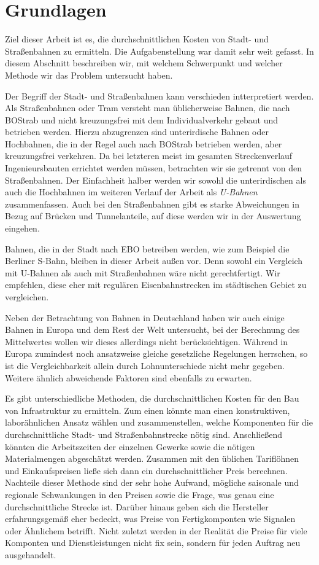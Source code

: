 \chapter{Grundlagen}

Ziel dieser Arbeit ist es, die durchschnittlichen Kosten von Stadt- und
Straßenbahnen zu ermitteln. Die Aufgabenstellung war damit sehr weit gefasst. In
diesem Abschnitt beschreiben wir, mit welchem Schwerpunkt und welcher Methode wir
das Problem untersucht haben.

Der Begriff der Stadt- und Straßenbahnen kann verschieden intterpretiert
werden. Als Straßenbahnen oder Tram versteht man üblicherweise Bahnen, die nach
BOStrab \cite{bostrab} und nicht kreuzungsfrei mit dem Individualverkehr gebaut
und betrieben werden. Hierzu abzugrenzen sind unterirdische Bahnen oder
Hochbahnen, die in der Regel auch nach BOStrab betrieben werden, aber
kreuzungsfrei verkehren. Da bei letzteren meist im gesamten Streckenverlauf
Ingenieursbauten errichtet werden müssen, betrachten wir sie getrennt von den
Straßenbahnen. Der Einfachheit halber werden wir sowohl die unterirdischen als
auch die Hochbahnen im weiteren Verlauf der Arbeit als \emph{U-Bahnen}
zusammenfassen. Auch bei den Straßenbahnen gibt es starke Abweichungen in Bezug
auf Brücken und Tunnelanteile, auf diese werden wir in der Auswertung eingehen.

Bahnen, die in der Stadt nach EBO \cite{ebo} betreiben werden, wie zum Beispiel
die Berliner S-Bahn, bleiben in dieser Arbeit außen vor. Denn sowohl ein
Vergleich mit U-Bahnen als auch mit Straßenbahnen wäre nicht gerechtfertigt. Wir
empfehlen, diese eher mit regulären Eisenbahnstrecken im städtischen Gebiet zu
vergleichen.

Neben der Betrachtung von Bahnen in Deutschland haben wir auch einige Bahnen in
Europa und dem Rest der Welt untersucht, bei der Berechnung des Mittelwertes
wollen wir dieses allerdings nicht berücksichtigen. Während in Europa zumindest noch
ansatzweise gleiche gesetzliche Regelungen herrschen, so ist die
Vergleichbarkeit allein durch Lohnunterschiede nicht mehr gegeben. Weitere
ähnlich abweichende Faktoren sind ebenfalls zu erwarten.

Es gibt unterschiedliche Methoden, die durchschnittlichen Kosten für den Bau von
Infrastruktur zu ermitteln. Zum einen könnte man einen konstruktiven,
laborähnlichen Ansatz wählen und zusammenstellen, welche Komponenten für die
durchschnittliche Stadt- und Straßenbahnstrecke nötig sind. Anschließend könnten
die Arbeitszeiten der einzelnen Gewerke sowie die nötigen Materialmengen
abgeschätzt werden. Zusammen mit den üblichen Tariflöhnen und Einkaufspreisen
ließe sich dann ein durchschnittlicher Preis berechnen. Nachteile dieser Methode
sind der sehr hohe Aufwand, mögliche saisonale und regionale Schwankungen in den
Preisen sowie die Frage, was genau eine durchschnittliche Strecke ist. Darüber
hinaus geben sich die Hersteller erfahrungsgemäß eher bedeckt, was Preise von
Fertigkomponten wie Signalen oder Ähnlichem betrifft. Nicht zuletzt werden in
der Realität die Preise für viele Komponten und Dienstleistungen nicht fix sein,
sondern für jeden Auftrag neu ausgehandelt.

